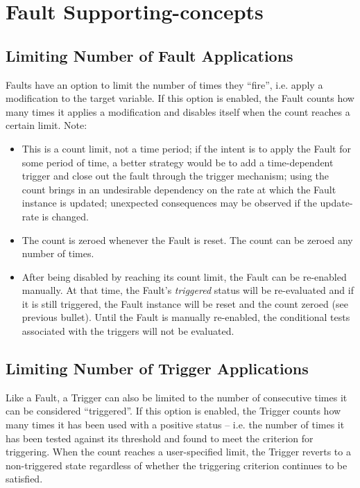 \documentclass[11pt,fleqn]{report}
\begin{document}
\section {Fault Supporting-concepts}

\subsection{Limiting Number of Fault Applications}
\label{sec:formulation:fault_support:fire_count}
Faults have an option to limit the number of times they ``fire'', i.e.
apply a modification to the target variable.
If this option is enabled, the Fault counts how many times it applies a
modification and disables itself when the count reaches a certain limit. Note:
\begin{itemize}
 \item This is a count limit, not a time period; if the intent is to apply
   the Fault for some period of time, a better strategy would be to add a
   time-dependent trigger and close out the fault through the trigger mechanism;
   using the count brings in an undesirable dependency on the rate at
   which the Fault instance is updated; unexpected consequences may be
   observed if the update-rate is changed.
 \item The count is zeroed whenever the Fault is reset. The count can be zeroed
   any number of times.
 \item After being disabled by reaching its count limit, the Fault can be
   re-enabled manually. At that time, the Fault's \textit{triggered} status will
   be re-evaluated and if it is still triggered, the Fault instance will be
   reset and the
   count zeroed (see previous bullet). Until the Fault is manually re-enabled,
   the conditional tests associated with the triggers will not be evaluated.
\end{itemize}

\subsection{Limiting Number of Trigger Applications}
\label{sec:formulation:fault_support:trigger_fire_count}
Like a Fault, a Trigger can also be limited to the number of consecutive
times it can be considered ``triggered''.
If this option is enabled, the Trigger counts how many times it has been
used with a positive status -- i.e. the number of times it has been tested
against its threshold and found to meet the criterion for triggering.
When the count reaches a user-specified limit, the Trigger reverts to a
non-triggered state regardless of whether the triggering criterion continues
to be satisfied.
\end{document}
